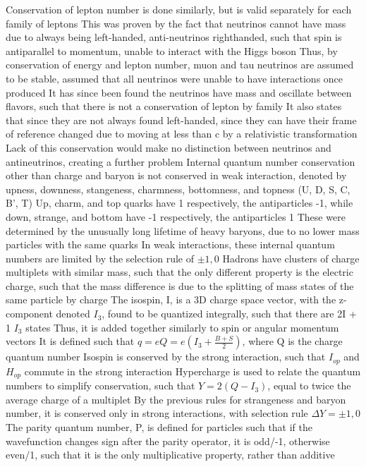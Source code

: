 \documentclass[11 pt, twoside]{article}
\newenvironment{outline*}
{
	\begin{outline}[enumerate]
	}
	{\end{outline}
}
\begin{document}
\begin{outline*}
	\2 Conservation of lepton number is done similarly, but is valid separately for each family of leptons
		\3 This was proven by the fact that neutrinos cannot have mass due to always being left-handed, anti-neutrinos righthanded, such that spin is antiparallel to momentum, unable to interact with the Higgs boson
		\3 Thus, by conservation of energy and lepton number, muon and tau neutrinos are assumed to be stable, assumed that all neutrinos were unable to have interactions once produced
		\3 It has since been found the neutrinos have mass and oscillate between flavors, such that there is not a conservation of lepton by family
			\4 It also states that since they are not always found left-handed, since they can have their frame of reference changed due to moving at less than c by a relativistic transformation
			\4 Lack of this conservation would make no distinction between neutrinos and antineutrinos, creating a further problem
	\2 Internal quantum number conservation other than charge and baryon is not conserved in weak interaction, denoted by upness, downness, stangeness, charmness, bottomness, and topness (U, D, S, C, B', T)
		\3 Up, charm, and top quarks have 1 respectively, the antiparticles -1, while down, strange, and bottom have -1 respectively, the antiparticles 1
		\3 These were determined by the unusually long lifetime of heavy baryons, due to no lower mass particles with the same quarks
		\3 In weak interactions, these internal quantum numbers are limited by the selection rule of $\pm 1, 0$
	\2 Hadrons have clusters of charge multiplets with similar mass, such that the only different property is the electric charge, such that the mass difference is due to the splitting of mass states of the same particle by charge
		\3 The isospin, I, is a 3D charge space vector, with the z-component denoted $I_3$, found to be quantized integrally, such that there are 2I + 1 $I_3$ states
			\4 Thus, it is added together similarly to spin or angular momentum vectors
		\3 It is defined such that $q = eQ = e(I_3 + \frac{B + S}{2})$, where Q is the charge quantum number
		\3 Isospin is conserved by the strong interaction, such that $I_{op}$ and $H_{op}$ commute in the strong interaction
	\2 Hypercharge is used to relate the quantum numbers to simplify conservation, such that $Y = 2(Q - I_3)$, equal to twice the average charge of a multiplet
		\3 By the previous rules for strangeness and baryon number, it is conserved only in strong interactions, with selection rule $\Delta Y = \pm 1, 0$
	\2 The parity quantum number, P, is defined for particles such that if the wavefunction changes sign after the parity operator, it is odd/-1, otherwise even/1, such that it is the only multiplicative property, rather than additive

\end{outline*}
\end{document}

